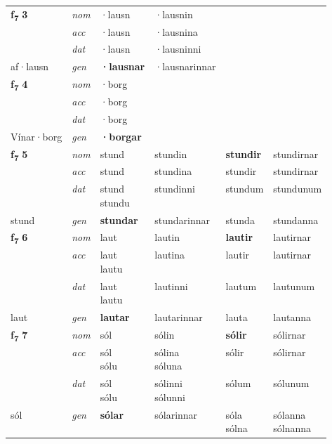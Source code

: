 \begin{longtable}[l]{X>{\footnotesize\itshape}XXXXX}
\multirow{3}{*}{{{\textbf{f{\textsubscript{7}}} \Large{\textbf{3}}}}} & nom & ·lausn & ·lausnin & \textbf{} &  \\*
 & acc & ·lausn & ·lausnina &  &  \\*
 & dat & ·lausn & ·lausninni &  &  \\*
 {\footnotesize{af\allowbreak ·lausn}} & gen & \textbf{·lausnar} & ·lausnarinnar &  &  \\
\midrule

\multirow{3}{*}{{{\textbf{f{\textsubscript{7}}} \Large{\textbf{4}}}}} & nom & ·borg &  & \textbf{} &  \\*
 & acc & ·borg &  &  &  \\*
 & dat & ·borg &  &  &  \\*
 {\footnotesize{Vínar\allowbreak ·borg}} & gen & \textbf{·borgar} &  &  &  \\
\midrule

\multirow{3}{*}{{{\textbf{f{\textsubscript{7}}} \Large{\textbf{5}}}}} & nom & stund & stundin & \textbf{stundir} & stundirnar \\*
 & acc & stund & stundina & stundir & stundirnar \\*
 & dat & \specialcell{stund\\ stundu} & stundinni & stundum & stundunum \\*
 {\footnotesize{stund}} & gen & \textbf{stundar} & stundarinnar & stunda & stundanna \\
\midrule

\multirow{3}{*}{{{\textbf{f{\textsubscript{7}}} \Large{\textbf{6}}}}} & nom & laut & lautin & \textbf{lautir} & lautirnar \\*
 & acc & \specialcell{laut\\ lautu} & lautina & lautir & lautirnar \\*
 & dat & \specialcell{laut\\ lautu} & lautinni & lautum & lautunum \\*
 {\footnotesize{laut}} & gen & \textbf{lautar} & lautarinnar & lauta & lautanna \\
\midrule

\multirow{3}{*}{{{\textbf{f{\textsubscript{7}}} \Large{\textbf{7}}}}} & nom & sól & sólin & \textbf{sólir} & sólirnar \\*
 & acc & \specialcell{sól\\ sólu} & \specialcell{sólina\\ sóluna} & sólir & sólirnar \\*
 & dat & \specialcell{sól\\ sólu} & \specialcell{sólinni\\ sólunni} & sólum & sólunum \\*
 {\footnotesize{sól}} & gen & \textbf{sólar} & sólarinnar & \specialcell{sóla\\ sólna} & \specialcell{sólanna\\ sólnanna} \\
\midrule


\end{longtable}
